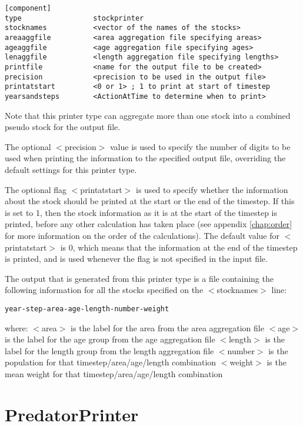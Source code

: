 \documentclass[]{book}
\begin{document}
\begin{verbatim}
[component]
type                 stockprinter
stocknames           <vector of the names of the stocks>
areaaggfile          <area aggregation file specifying areas>
ageaggfile           <age aggregation file specifying ages>
lenaggfile           <length aggregation file specifying lengths>
printfile            <name for the output file to be created>
precision            <precision to be used in the output file>
printatstart         <0 or 1> ; 1 to print at start of timestep
yearsandsteps        <ActionAtTime to determine when to print>
\end{verbatim}

Note that this printer type can aggregate more than one stock into a
combined pseudo stock for the output file.

The optional \(<\)precision\(>\) value is used to specify the number of
digits to be used when printing the information to the specified output
file, overriding the default settings for this printer type.

The optional flag \(<\)printatstart\(>\) is used to specify whether the
information about the stock should be printed at the start or the end of
the timestep. If this is set to 1, then the stock information as it is
at the start of the timestep is printed, before any other calculation
has taken place (see appendix \ref{chap:order} for more information on the order of the
calculations). The default value for \(<\)printatstart\(>\) is 0, which
means that the information at the end of the timestep is printed, and is
used whenever the flag is not specified in the input file.

The output that is generated from this printer type is a file containing
the following information for all the stocks specified on the
\(<\)stocknames\(>\) line:

\begin{verbatim}
year-step-area-age-length-number-weight
\end{verbatim}

where: \(<\)area\(>\) is the label for the area from the area aggregation
file \(<\)age\(>\) is the label for the age group from the age aggregation
file \(<\)length\(>\) is the label for the length group from the length
aggregation file \(<\)number\(>\) is the population for that
timestep/area/age/length combination \(<\)weight\(>\) is the mean weight for
that timestep/area/age/length combination

\hypertarget{sec:predatorprinter}{%
\section{PredatorPrinter}\label{sec:predatorprinter}}
\end{document}
